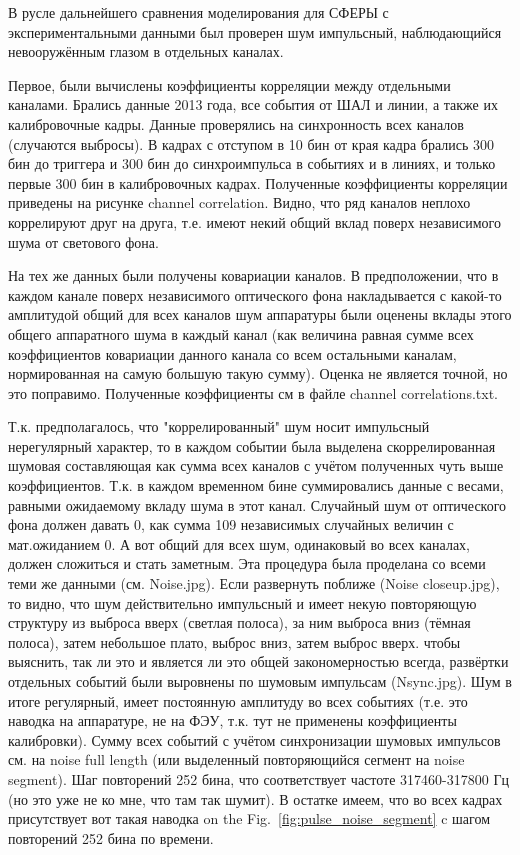 \documentclass[final,5p,times,twocolumn]{elsarticle}
\begin{document}
{\Russian

В русле дальнейшего сравнения моделирования для СФЕРЫ с экспериментальными данными был проверен шум импульсный, наблюдающийся невооружённым глазом в отдельных каналах.

Первое, были вычислены коэффициенты корреляции между отдельными каналами. Брались данные 2013 года, все события от ШАЛ и линии, а также их калибровочные кадры. Данные проверялись на синхронность всех каналов (случаются выбросы). В кадрах с отступом в 10 бин от края кадра брались 300 бин до триггера и 300 бин до синхроимпульса в событиях и в линиях, и только первые 300 бин в калибровочных кадрах. Полученные коэффициенты корреляции приведены на рисунке channel correlation. Видно, что ряд каналов неплохо коррелируют друг на друга, т.е. имеют некий общий вклад поверх независимого шума от светового фона.

На тех же данных были получены ковариации каналов. В предположении, что в каждом канале поверх независимого оптического фона накладывается с какой-то амплитудой общий для всех каналов шум аппаратуры были оценены вклады этого общего аппаратного шума в каждый канал (как величина равная сумме всех коэффициентов ковариации данного канала со всем остальными каналам, нормированная на самую большую такую сумму). Оценка не является точной, но это поправимо. Полученные коэффициенты см в файле channel correlations.txt.

Т.к. предполагалось, что "коррелированный" шум носит импульсный нерегулярный характер, то в каждом событии была выделена скоррелированная шумовая составляющая как сумма всех каналов с учётом полученных чуть выше коэффициентов. Т.к. в каждом временном бине суммировались данные с весами, равными ожидаемому вкладу шума в этот канал. Случайный шум от оптического фона должен давать 0, как сумма 109 независимых случайных величин с мат.ожиданием 0. А вот общий для всех шум, одинаковый во всех каналах, должен сложиться и стать заметным.
Эта процедура была проделана со всеми теми же данными (см. Noise.jpg). Если развернуть поближе (Noise  closeup.jpg), то видно, что шум действительно импульсный и имеет некую повторяющую структуру из выброса вверх (светлая полоса), за ним выброса вниз (тёмная полоса), затем небольшое плато, выброс вниз, затем выброс вверх. чтобы выяснить, так ли это и является ли это общей закономерностью всегда, развёртки отдельных событий были выровнены по шумовым импульсам (Nsync.jpg). Шум в итоге регулярный, имеет постоянную амплитуду во всех событиях (т.е. это наводка на аппаратуре, не на ФЭУ, т.к. тут не применены коэффициенты калибровки).
Сумму всех событий с учётом синхронизации шумовых импульсов см. на noise full length (или выделенный повторяющийся сегмент на noise segment). Шаг повторений 252 бина, что соответствует частоте 317460-317800 Гц (но это уже не ко мне, что там так шумит). В остатке имеем, что во всех кадрах присутствует вот такая наводка on the Fig.~\ref{fig:pulse_noise_segment}  c шагом повторений 252 бина по времени.

}
\end{document}
